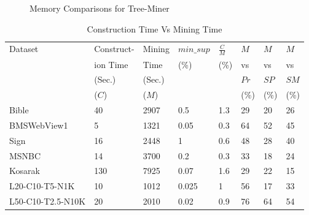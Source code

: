 \begin{figure*}[!tb]
\begin{subfigure}{0.4\linewidth}
\begin{adjustbox}{max width=\textwidth}
\end{adjustbox}
\caption{}
\end{subfigure}
        \caption{Memory Comparisons for Tree-Miner}
        \label{graph:memory_comparison_tree_miner}
        \end{figure*}

\begin{table*}[!htbp]
\centering
\begin{tabular}{|l|l|l|l|l|l|l|l|}
\hline
Dataset & Construct- & Mining & $min\_sup$ & $\frac{C}{M}$ & $ M $ & $M$ & $M$ \\ 
& ion Time  &  Time & (\%) & (\%) & vs & vs & vs\\
& (Sec.) & (Sec.) & & & $Pr$ & $SP$ & $SM$\\ 
& ($C$) &  ($M$) & & & (\%) & (\%)&(\%)\\ 
\hline
 Bible & 40 & 2907 & 0.5 & 1.3 & 29  & 20 & 26\\ \hline
 BMSWebView1 & 5 & 1321 &  0.05 & 0.3 & 64 & 52 & 45\\ \hline
 Sign  &  16  &  2448 & 1 & 0.6 & 48 & 28 & 40\\ \hline
 MSNBC & 14 & 3700 & 0.2 & 0.3 & 33 & 18 & 24\\ \hline
 Kosarak & 130 & 7925 & 0.07 & 1.6 & 29 & 22 & 15\\ \hline
L20-C10-T5-N1K & 10 & 1012 & 0.025 & 1 & 56 & 17 & 33\\ \hline
L50-C10-T2.5-N10K & 20 & 2010 & 0.02 & 0.9 & 76 & 64 & 54\\ \hline
\end{tabular}
\caption{Construction Time Vs Mining Time}
\label{table:construction_time_tree_miner}
\end{table*}





